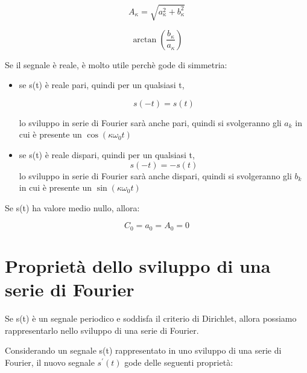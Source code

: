 {
    \Large 
    \begin{equation}
        A_\kappa  
        = 
        \sqrt{a_\kappa ^{2} + b_\kappa ^{2}} 
    \end{equation}
} 

{
    \Large 
    \begin{equation}
        \arctan(\frac{b_\kappa}{a_\kappa})
    \end{equation}
}

Se il segnale è reale, è molto utile perchè gode di simmetria: 
\begin{itemize}
    \item se s(t) è reale pari, quindi per un qualsiasi t, 
    {
        \Large 
        \begin{equation}
            s(-t) = s(t)
        \end{equation}
    
    }
    
    lo sviluppo in serie di Fourier sarà anche pari, quindi si svolgeranno gli $a_k$ in cui è presente un $\cos(\kappa \omega_0 t)$
    
    \item  se s(t) è reale dispari, quindi per un qualsiasi t, 
    {
        \Large 
        \begin{equation}
            s(-t) = -s(t)
        \end{equation}
    } 
    lo sviluppo in serie di Fourier sarà anche dispari, quindi si svolgeranno gli $b_k$ in cui è presente un $\sin(\kappa \omega_0 t)$ \newline
\end{itemize}

Se s(t) ha valore medio nullo, allora: 

{
    \Large 
    \begin{equation}
        C_0 = a_0 = A_0 = 0
    \end{equation}
} 

\newpage 

\section{Proprietà dello sviluppo di una serie di Fourier} 


Se s(t) è un segnale periodico e soddisfa il criterio di Dirichlet, allora possiamo 
rappresentarlo nello sviluppo di una serie di Fourier. \newline 

Considerando un segnale s(t) rappresentato in uno sviluppo di una serie di Fourier, il nuovo segnale $s^{'} (t)$ gode delle seguenti proprietà: \newline 

